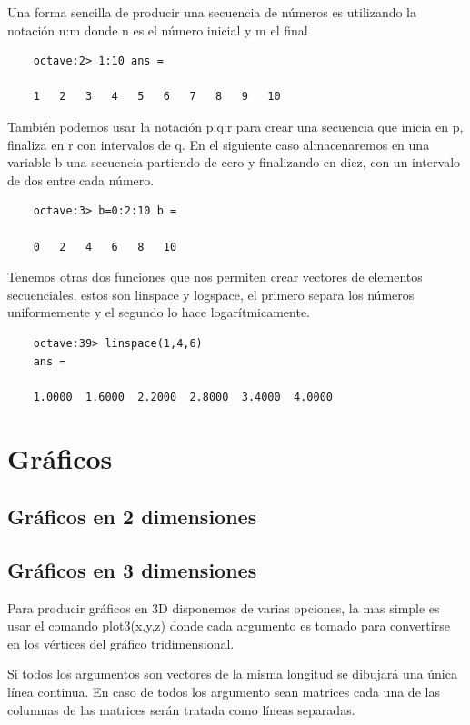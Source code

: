\documentclass[a4,12pt]{article}
\begin{document}
Una forma sencilla de producir una secuencia de números es utilizando la notación n:m
donde n es el número inicial y m el final

\begin{verbatim}
	octave:2> 1:10 ans =

	1	2	3	4	5	6	7	8	9	10
\end{verbatim}

También podemos usar la notación p:q:r para crear una secuencia que inicia en p, finaliza en r con intervalos de q. En el siguiente caso almacenaremos en una variable b una secuencia partiendo de cero y finalizando en diez, con un intervalo de dos entre cada número.

\begin{verbatim}
	octave:3> b=0:2:10 b =

	0	2	4	6	8	10
\end{verbatim}

Tenemos	otras	dos	funciones	que	nos	permiten	crear	vectores	de	elementos secuenciales,  estos  son  linspace y  logspace,  el  primero  separa  los  números uniformemente y el segundo lo hace logarítmicamente.

\begin{verbatim}
	octave:39> linspace(1,4,6)
	ans =

	1.0000	1.6000	2.2000	2.8000	3.4000	4.0000
\end{verbatim}

\section{Gráficos}

\subsection{Gráficos en 2 dimensiones}

\subsection{Gráficos en 3 dimensiones}

Para producir gráficos en 3D disponemos de varias opciones, la mas simple es usar el comando  plot3(x,y,z) donde cada argumento es tomado para convertirse en los vértices del gráfico tridimensional.

Si todos los argumentos son vectores de la misma longitud se dibujará una única línea continua. En caso de todos los argumento sean matrices cada una de las columnas de las matrices serán tratada como líneas separadas.
\end{document}
